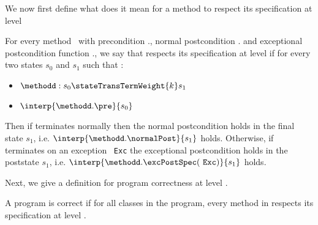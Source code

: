 We now first define what does it mean for a method to respect its specification at level 
\begin{defCorrect} \label{defCorrectLevel}
For every method \methodd \ with precondition \methodd.\pre, normal postcondition \methodd.\normalPost{}
and exceptional postcondition function \methodd.\excPostSpec, we say that \methodd{} respects its specification at level  if 
for every two states $s_0$ and $s_1$ such that :
\begin{itemize}
      
      \item   $\methodd : s_0  \stateTransTermWeight{k} s_1   $
      \item   $ \interp{\methodd.\pre }{ s_0 }$
\end{itemize}
Then if \methodd{} terminates normally then the normal postcondition holds in the final state $s_1 $, i.e.  $\interp{\methodd.\normalPost}{s_1}$ holds. 
Otherwise, if  \methodd{}  terminates on an exception \mbox{ \rm \texttt{Exc}} the exceptional postcondition holds in the poststate $s_1 $, i.e.
$ \interp{\methodd.\excPostSpec(  \mbox{ \rm \texttt{Exc}} )}{s_1} $ holds.
\end{defCorrect}

Next, we give a definition for program correctness at level . 

\begin{defCorrect}\label{defCorrectProgramLevel}
A program is correct if for all classes \class{} in the program, every method \methodd{} in \class{}
respects its specification at level .
\end{defCorrect}



